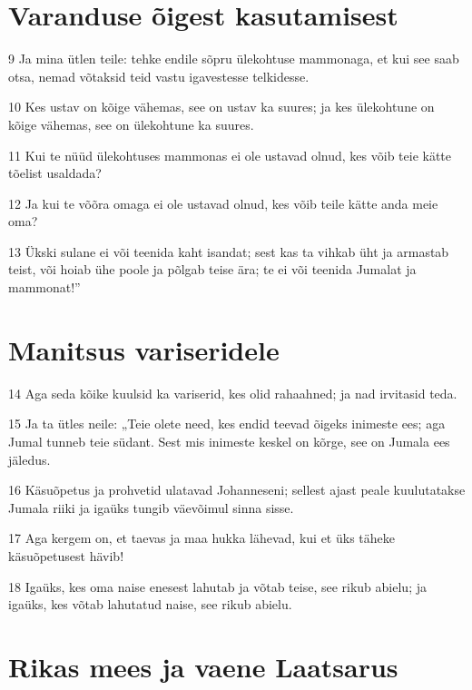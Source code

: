 \section*{Varanduse õigest kasutamisest}

\par 9 Ja mina ütlen teile: tehke endile sõpru ülekohtuse mammonaga, et kui see saab otsa, nemad võtaksid teid vastu igavestesse telkidesse.
\par 10 Kes ustav on kõige vähemas, see on ustav ka suures; ja kes ülekohtune on kõige vähemas, see on ülekohtune ka suures.
\par 11 Kui te nüüd ülekohtuses mammonas ei ole ustavad olnud, kes võib teie kätte tõelist usaldada?
\par 12 Ja kui te võõra omaga ei ole ustavad olnud, kes võib teile kätte anda meie oma?
\par 13 Ükski sulane ei või teenida kaht isandat; sest kas ta vihkab üht ja armastab teist, või hoiab ühe poole ja põlgab teise ära; te ei või teenida Jumalat ja mammonat!”

\section*{Manitsus variseridele}

\par 14 Aga seda kõike kuulsid ka variserid, kes olid rahaahned; ja nad irvitasid teda.
\par 15 Ja ta ütles neile: „Teie olete need, kes endid teevad õigeks inimeste ees; aga Jumal tunneb teie südant. Sest mis inimeste keskel on kõrge, see on Jumala ees jäledus.
\par 16 Käsuõpetus ja prohvetid ulatavad Johanneseni; sellest ajast peale kuulutatakse Jumala riiki ja igaüks tungib väevõimul sinna sisse.
\par 17 Aga kergem on, et taevas ja maa hukka lähevad, kui et üks täheke käsuõpetusest hävib!
\par 18 Igaüks, kes oma naise enesest lahutab ja võtab teise, see rikub abielu; ja igaüks, kes võtab lahutatud naise, see rikub abielu.

\section*{Rikas mees ja vaene Laatsarus}

